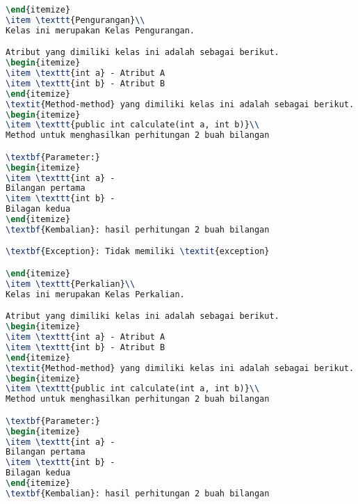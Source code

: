 \begin{lstlisting}[language=TeX, caption=Hasil pengujian kode program sederhana]
\end{itemize}
\item \texttt{Pengurangan}\\ 
Kelas ini merupakan Kelas Pengurangan.

Atribut yang dimiliki kelas ini adalah sebagai berikut.
\begin{itemize}
\item \texttt{int a} - Atribut A
\item \texttt{int b} - Atribut B
\end{itemize}
\textit{Method-method} yang dimiliki kelas ini adalah sebagai berikut.
\begin{itemize}
\item \texttt{public int calculate(int a, int b)}\\ 
Method untuk menghasilkan perhitungan 2 buah bilangan

\textbf{Parameter:}
\begin{itemize}
\item \texttt{int a} - 
Bilangan pertama
\item \texttt{int b} - 
Bilagan kedua
\end{itemize}
\textbf{Kembalian}: hasil perhitungan 2 buah bilangan

\textbf{Exception}: Tidak memiliki \textit{exception}

\end{itemize}
\item \texttt{Perkalian}\\ 
Kelas ini merupakan Kelas Perkalian.

Atribut yang dimiliki kelas ini adalah sebagai berikut.
\begin{itemize}
\item \texttt{int a} - Atribut A
\item \texttt{int b} - Atribut B
\end{itemize}
\textit{Method-method} yang dimiliki kelas ini adalah sebagai berikut.
\begin{itemize}
\item \texttt{public int calculate(int a, int b)}\\ 
Method untuk menghasilkan perhitungan 2 buah bilangan

\textbf{Parameter:}
\begin{itemize}
\item \texttt{int a} - 
Bilangan pertama
\item \texttt{int b} - 
Bilagan kedua
\end{itemize}
\textbf{Kembalian}: hasil perhitungan 2 buah bilangan


\end{lstlisting}

